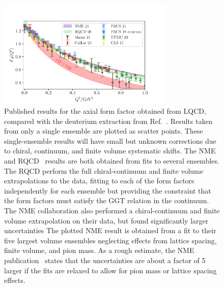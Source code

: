 \begin{figure}[hbt!]
\centering
\includegraphics[width=0.75\textwidth]{plots/gaq2-overlay-standalone.pdf}
\vspace{10pt}
\caption{
Published results for the axial form factor obtained from LQCD,
 compared with the deuterium extraction from Ref.~\cite{Meyer:2016oeg}.
Results taken from only a single ensemble are plotted as scatter points.
These single-ensemble results will have small but unknown corrections due to chiral, continuum,
 and finite volume systematic shifts.
The NME~\cite{Park:2021ypf} and RQCD~\cite{RQCD:2019jai}
 results are both obtained from fits to several ensembles.
The RQCD perform the full chiral-continuum and finite volume extrapolations to the data,
 fitting to each of the form factors independently for each ensemble but providing
 the constraint that the form factors must satisfy the GGT relation in the continuum.
The NME collaboration also performed a chiral-continuum and finite volume extrapolation
 on their data, but found significantly larger uncertainties
The plotted NME result is obtained from a fit to their five largest volume ensembles neglecting
 effects from lattice spacing, finite volume, and pion mass.
As a rough estimate, the NME publication~\cite{Park:2021ypf} states that
 the uncertainties are about a factor of 5 larger if the fits are relaxed
 to allow for pion mass or lattice spacing effects.}
\label{fig:gaq2_overlay}
\end{figure}


